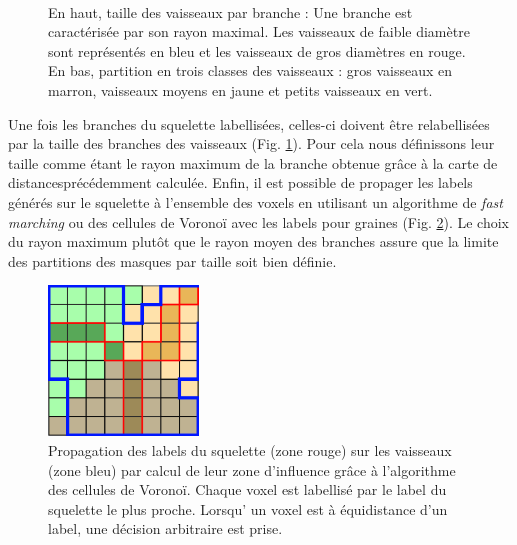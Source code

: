 \begin{figure}[!ht]
  \centering
  \\
  \caption{En haut, taille des vaisseaux par branche : Une branche est caractérisée par son rayon maximal. Les vaisseaux de faible diamètre sont représentés en bleu et les vaisseaux de gros diamètres en rouge. En bas, partition en trois classes des vaisseaux : gros vaisseaux en marron, vaisseaux moyens en jaune et petits vaisseaux en vert.}
  \label{fig:vessels_partition}
\end{figure}

Une fois les branches du squelette labellisées, celles-ci doivent être relabellisées par la taille des branches des vaisseaux (Fig. \ref{fig:vessels_partition}). Pour cela nous définissons leur taille comme étant le rayon maximum de la branche obtenue grâce à la carte de distancesprécédemment calculée. Enfin, il est possible de propager les labels générés sur le squelette à l'ensemble des voxels en utilisant un algorithme de \textit{fast marching} ou des cellules de Voronoï avec les labels pour graines (Fig. \ref{fig:voronoi}). Le choix du rayon maximum plutôt que le rayon moyen des branches assure que la limite des partitions des masques par taille soit bien définie.

\begin{figure}[!ht]
  \centering
  \includegraphics[height=4cm]{Images/voronoi.png}
  \caption{Propagation des labels du squelette (zone rouge) sur les vaisseaux (zone bleu) par calcul de leur zone d'influence grâce à l'algorithme des cellules de Voronoï. Chaque voxel est labellisé par le label du squelette le plus proche. Lorsqu' un voxel est à équidistance d'un label, une décision arbitraire est prise.}
  \label{fig:voronoi}
\end{figure}

